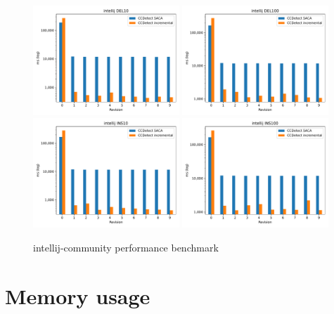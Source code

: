 \begin{figure}[H]
    \begin{center}
        \includegraphics[width=0.49\textwidth]{figures/performancegraphs/intellij_DEL10.pdf}
        \includegraphics[width=0.49\textwidth]{figures/performancegraphs/intellij_DEL100.pdf}
        \includegraphics[width=0.49\textwidth]{figures/performancegraphs/intellij_INS10.pdf}
        \includegraphics[width=0.49\textwidth]{figures/performancegraphs/intellij_INS100.pdf}
    \end{center}
    \caption{intellij-community performance benchmark}
    \label{fig:intellij}
\end{figure}

\section{Memory usage}

